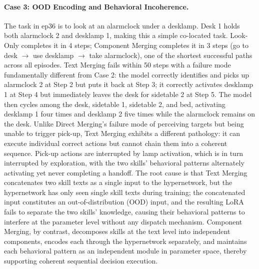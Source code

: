 \paragraph{Case 3: OOD Encoding and Behavioral Incoherence.}
The task in ep36 is to look at an alarmclock under a desklamp. Desk 1 holds both alarmclock 2 and desklamp 1, making this a simple co-located task. Look-Only completes it in 4 steps; Component Merging completes it in 3 steps (go to desk $\rightarrow$ use desklamp $\rightarrow$ take alarmclock), one of the shortest successful paths across all episodes. Text Merging fails within 50 steps with a failure mode fundamentally different from Case 2: the model correctly identifies and picks up alarmclock 2 at Step 2 but puts it back at Step 3; it correctly activates desklamp 1 at Step 4 but immediately leaves the desk for sidetable 2 at Step 5. The model then cycles among the desk, sidetable 1, sidetable 2, and bed, activating desklamp 1 four times and desklamp 2 five times while the alarmclock remains on the desk. Unlike Direct Merging's failure mode of perceiving targets but being unable to trigger pick-up, Text Merging exhibits a different pathology: it can execute individual correct actions but cannot chain them into a coherent sequence. Pick-up actions are interrupted by lamp activation, which is in turn interrupted by exploration, with the two skills' behavioral patterns alternately activating yet never completing a handoff. The root cause is that Text Merging concatenates two skill texts as a single input to the hypernetwork, but the hypernetwork has only seen single skill texts during training; the concatenated input constitutes an out-of-distribution (OOD) input, and the resulting LoRA fails to separate the two skills' knowledge, causing their behavioral patterns to interfere at the parameter level without any dispatch mechanism. Component Merging, by contrast, decomposes skills at the text level into independent components, encodes each through the hypernetwork separately, and maintains each behavioral pattern as an independent module in parameter space, thereby supporting coherent sequential decision execution.
